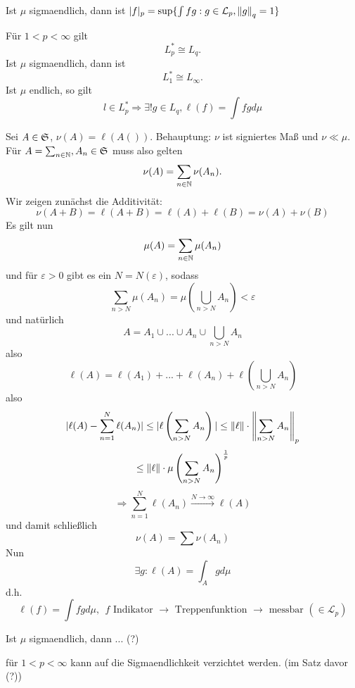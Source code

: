 	\begin{satz}
		Ist $\mu$ sigmaendlich, dann ist $|f|_p=\sup\{\int fg: g\in\mathcal{L}_p, \norm{g}_q=1\}$
	\end{satz}
	
	\begin{satz}
		Für $1<p<\infty$ gilt
		\[ L_p^*\cong L_q. \]
		Ist $\mu$ sigmaendlich, dann ist
		\[ L_1^*\cong L_\infty. \]
		Ist $\mu$ endlich, so gilt
		\[ l\in L_p^*\Rightarrow \exists! g\in L_q, \ell(f)=\int fgd\mu \]
	\end{satz}

	\begin{bew}
		Sei $A\in\S$, $\nu(A)=\ell(A())$. Behauptung: $\nu$ ist signiertes Maß und $\nu \ll \mu$. Für $A=\sum_{n\in\N}, A_n\in\S$ muss also gelten
		\[ \nu(A)=\sum_{n\in\N} \nu(A_n). \]
		Wir zeigen zunächst die Additivität:
		\[ \nu(A+B)=\ell(A+B)=\ell(A)+\ell(B)=\nu(A)+\nu(B) \]
		Es gilt nun
		\[ \mu(A)=\sum_{n\in\N} \mu(A_n) \]
		und für $\varepsilon>0$ gibt es ein $N=N(\varepsilon)$, sodass
		\[ \sum_{n>N}\mu(A_n)=\mu(\bigcup_{n>N}A_n)<\varepsilon \]
		und natürlich
		\[ A=A_1\cup ...\cup A_n\cup\bigcup_{n>N}A_n \]
		also 
		\[ \ell(A)=\ell(A_1)+...+\ell(A_n)+\ell\left(\bigcup_{n>N}A_n\right) \]
		also
		\[ |\ell(A)-\sum_{n=1}^N\ell(A_n)|\le|\ell\left(\sum_{n>N}A_n\right)|\le\norm{\ell}\cdot\norm{\sum_{n>N} A_n}_p \]
		\[ \le \norm{\ell}\cdot\mu\left(\sum_{n>N}A_n\right)^\frac{1}{p} \]
		\[ \Rightarrow \sum_{n=1}^N\ell(A_n)\stackrel{N\to\infty}{\longrightarrow}\ell(A) \]
		und damit schließlich
		\[ \nu(A)=\sum\nu(A_n) \]
		Nun
		\[ \exists g: \ell(A)=\int_A gd\mu \]
		d.h. 
		\[ \ell(f)=\int fgd\mu, \:\: f\text{ Indikator }\rightarrow \text{ Treppenfunktion }\rightarrow\text{ messbar }(\in\mathcal{L}_p) \]
	\end{bew}

	\begin{satz}
		Ist $\mu$ sigmaendlich, dann ... (?)
	\end{satz}

	\begin{satz}
		für $1<p<\infty$ kann auf die Sigmaendlichkeit verzichtet werden. (im Satz davor (?))
	\end{satz}
